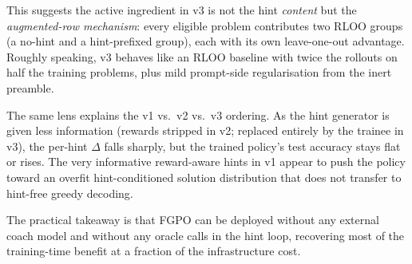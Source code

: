 This suggests the active ingredient in v3 is not the hint
\emph{content} but the \emph{augmented-row mechanism}: every eligible
problem contributes two RLOO groups (a no-hint and a hint-prefixed
group), each with its own leave-one-out advantage. Roughly speaking, v3
behaves like an RLOO baseline with twice the rollouts on half the
training problems, plus mild prompt-side regularisation from the
inert preamble.

The same lens explains the v1 vs.\ v2 vs.\ v3 ordering. As the hint
generator is given less information (rewards stripped in v2; replaced
entirely by the trainee in v3), the per-hint $\Delta$ falls sharply,
but the trained policy's test accuracy stays flat or rises. The very
informative reward-aware hints in v1 appear to push the policy toward
an overfit hint-conditioned solution distribution that does not
transfer to hint-free greedy decoding.

The practical takeaway is that FGPO can be deployed without any
external coach model and without any oracle calls in the hint loop,
recovering most of the training-time benefit at a fraction of the
infrastructure cost.
